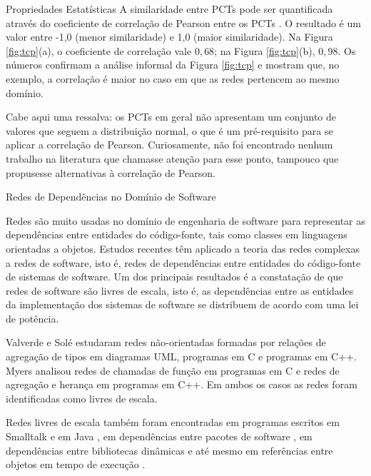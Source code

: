 \begin{section}{Propriedades Estatísticas}
A similaridade entre PCTs pode ser quantificada através do coeficiente de correlação de Pearson entre os PCTs \cite{Milo2004}. O resultado é um valor entre -1,0 (menor similaridade) e 1,0 (maior similaridade). Na Figura \ref{fig:tcp}(a), o coeficiente de correlação vale $0,68$; na Figura \ref{fig:tcp}(b), $0,98$. Os números confirmam a análise informal da Figura \ref{fig:tcp} e mostram que, no exemplo, a correlação é maior no caso em que as redes pertencem ao mesmo domínio.

Cabe aqui uma ressalva: os PCTs em geral não apresentam um conjunto de valores que seguem a distribuição normal, o que é um pré-requisito para se aplicar a correlação de Pearson. Curiosamente, não foi encontrado nenhum trabalho na literatura que chamasse atenção para esse ponto, tampouco que propusesse alternativas à correlação de Pearson.

% 
% 
% 
% 

\end{section}

\begin{section}{Redes de Dependências no Domínio de Software}

	Redes são muito usadas no domínio de engenharia de software para representar as dependências entre entidades do código-fonte, tais como classes em linguagens orientadas a objetos. 
	Estudos recentes têm aplicado a teoria das redes complexas a redes de software, isto é, redes de dependências entre entidades do código-fonte de sistemas de software. Um dos principais resultados é a constatação de que redes de software são livres de escala, isto é, as dependências entre as entidades da implementação dos sistemas de software se distribuem de acordo com uma lei de potência.
	
	Valverde e Solé \cite{Valverde2003} estudaram redes não-orientadas formadas por relações de agregação de tipos em diagramas UML, programas em C e programas em C++. Myers \cite{Myers2003} analisou redes de chamadas de função em programas em C e redes de agregação e herança em programas em C++. Em ambos os casos as redes foram identificadas como livres de escala. 

	Redes livres de escala também foram encontradas em programas escritos em Smalltalk \cite{Marchesi2004,Concas2007} e em Java \cite{Hyland-Wood2006,Baxter2006,Ichii2008}, em dependências entre pacotes de software \cite{Labelle2004}, em dependências entre bibliotecas dinâmicas \cite{Louridas2008} e até mesmo em referências entre objetos em tempo de execução \cite{Potanin2005}.
\end{section}

